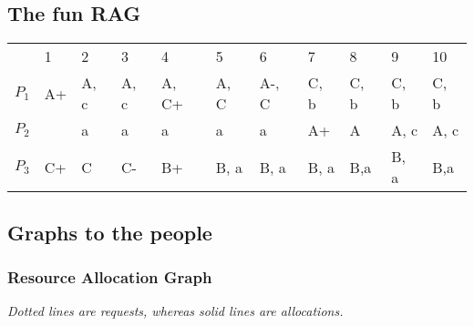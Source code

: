 \documentclass[a4paper, 11pt]{article}
\begin{document}
        \subsection{The fun RAG}
        \begin{table}[h!]
            \centering
            \begin{tabular}{|l||l|l|l|l|l|l|l|l|l|l|} 
                  \hline
                  \multicolumn{1}{|l|}{} & 1  & 2    & 3    & 4     & 5    & 6     & 7    & 8    & 9    & 10    \\ 
                  \hhline{|=:t:==========|}
                  $P_1$               & A+ & A, c & A, c & A, C+ & A, C & A-, C & C, b & C, b & C, b & C, b  \\ 
                  \hline
                  $P_2$               &    & a    & a    & a     & a    & a     & A+   & A    & A, c & A, c  \\ 
                  \hline
                  $P_3$               & C+ & C    & C-   & B+    & B, a & B, a  & B, a & B,a  & B, a & B,a   \\
                  \hline
            \end{tabular}
      \end{table}

      \subsection{Graphs to the people}
      \subsubsection{Resource Allocation Graph}
      \begin{figure}[h!]
            \centering
      \end{figure}
      \begin{center}
            \textit{Dotted lines are requests, whereas solid lines are allocations.}
      \end{center}
      
\end{document}
